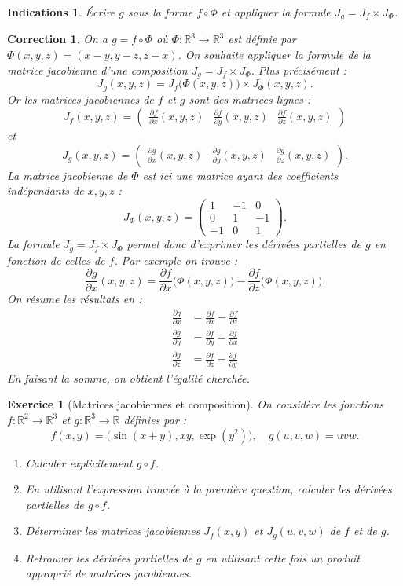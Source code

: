 \documentclass[11pt,a4paper]{article}
\newcommand{\Rr}{\mathbb{R}} \newcommand{\R}{\mathbb{R}}
\theoremstyle{exostyle}
\newtheorem{exo}{Exercice}
\newtheorem{ind}{Indications}
\newtheorem{cor}{Correction}
\newcommand{\exercice}[1]{} \newcommand{\finexercice}{}
\newcommand{\enonce}{\begin{exo}} \newcommand{\finenonce}{\end{exo}}
\newcommand{\indication}{\begin{ind}} \newcommand{\finindication}{\end{ind}}
\newcommand{\correction}{\begin{cor}} \newcommand{\fincorrection}{\end{cor}}
\begin{document}
\indication
Écrire $g$ sous la forme $f \circ \Phi$ et appliquer la formule \og{}$J_g = J_f \times J_\Phi$\fg{}.
\finindication

\correction
On a $g = f \circ \Phi$ où $\Phi : \Rr^3 \to \Rr^3$ est définie par $\Phi(x,y,z)=(x-y,y-z,z-x)$.
On souhaite appliquer la formule de la matrice jacobienne d'une composition \og{}$J_g = J_f \times J_\Phi$\fg{}.
Plus précisément :
\[
J_g(x,y,z) = J_f\big(\Phi(x,y,z)\big)  \times J_\Phi(x,y,z).
\]
Or les matrices jacobiennes de $f$ et $g$ sont des matrices-lignes :
\[
J_f(x,y,z) = \begin{pmatrix}
	\frac{\partial f}{\partial x}(x,y,z)&
	\frac{\partial f}{\partial y}(x,y,z)&
	\frac{\partial f}{\partial z}(x,y,z)
	\end{pmatrix}
\]
et
\[
J_g(x,y,z) = \begin{pmatrix}
	\frac{\partial g}{\partial x}(x,y,z)& 
	\frac{\partial g}{\partial y}(x,y,z)&
	\frac{\partial g}{\partial z}(x,y,z)
\end{pmatrix}.
\]	
La matrice jacobienne de $\Phi$ est ici une matrice ayant des coefficients indépendants de $x,y,z$ :
\[
J_\Phi(x,y,z) = 
\begin{pmatrix}
1 & - 1 & 0 \\
0 & 1 & -1 \\
-1 & 0 & 1	
\end{pmatrix}.
\]
La formule \og{}$J_g = J_f \times J_\Phi$\fg{} permet donc d'exprimer les dérivées partielles de $g$ en fonction de celles de $f$. Par exemple on trouve :
\[ 
\frac{\partial g}{\partial x}(x,y,z) = 
\frac{\partial f}{\partial x}\big(\Phi(x,y,z)\big)-\frac{\partial f}{\partial z}\big(\Phi(x,y,z)\big).
\]
On résume les résultats en :
\begin{align*}
	\frac{\partial g}{\partial x}
	&=
	\frac{\partial f}{\partial x}-\frac{\partial f}{\partial z}
	\\
	\frac{\partial g}{\partial y}
	&=
	\frac{\partial f}{\partial y}-\frac{\partial f}{\partial x}
	\\
	\frac{\partial g}{\partial z}
	&=
	\frac{\partial f}{\partial z}-\frac{\partial f}{\partial y}
\end{align*}
En faisant la somme, on obtient l'égalité cherchée.
\fincorrection
\finexercice




\exercice{}  
\enonce[Matrices jacobiennes et composition]
On considère les fonctions $f\colon \R^2\longrightarrow \R^3$ et
$g\colon \R^3\longrightarrow \R$ définies par :
\[
f(x,y)= \big(\sin (x+y), xy, \exp(y^2)\big),\quad 
g(u,v,w)= uvw .
\]
\begin{enumerate}
	\item Calculer explicitement $g\circ f$.
	\item En utilisant l'expression trouvée à la première question, calculer les dérivées partielles de $g\circ f$.
	\item Déterminer les matrices jacobiennes $J_f(x,y)$ et $J_g(u,v,w)$ de $f$ et de $g$. 
	\item Retrouver les dérivées partielles de $g$ en utilisant cette fois un produit approprié de matrices jacobiennes. 
\end{enumerate}
\finenonce
\end{document}
